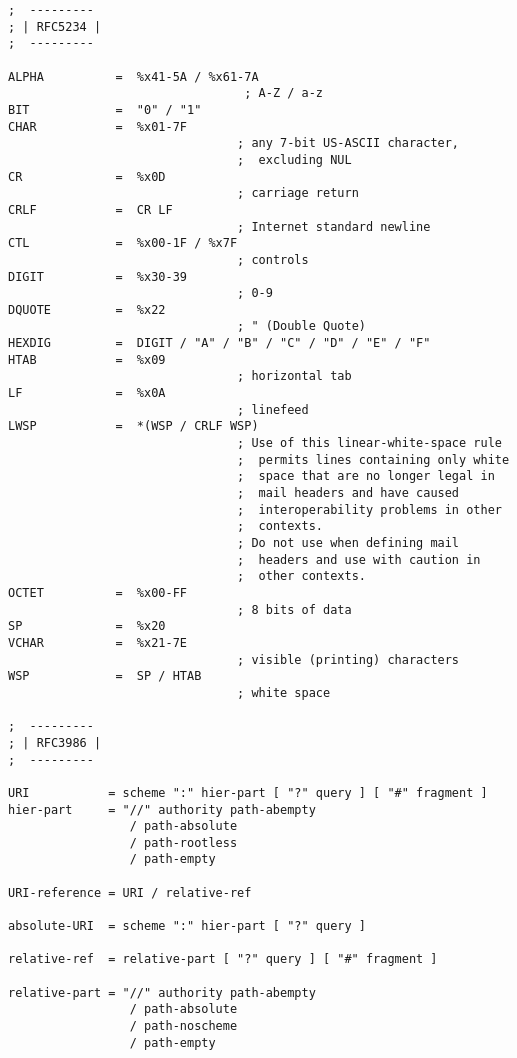 \begin{verbatim}
;  ---------
; | RFC5234 |
;  ---------

ALPHA          =  %x41-5A / %x61-7A
                                 ; A-Z / a-z
BIT            =  "0" / "1"
CHAR           =  %x01-7F
                                ; any 7-bit US-ASCII character,
                                ;  excluding NUL
CR             =  %x0D
                                ; carriage return
CRLF           =  CR LF
                                ; Internet standard newline
CTL            =  %x00-1F / %x7F
                                ; controls
DIGIT          =  %x30-39
                                ; 0-9
DQUOTE         =  %x22
                                ; " (Double Quote)
HEXDIG         =  DIGIT / "A" / "B" / "C" / "D" / "E" / "F"
HTAB           =  %x09
                                ; horizontal tab
LF             =  %x0A
                                ; linefeed
LWSP           =  *(WSP / CRLF WSP)
                                ; Use of this linear-white-space rule
                                ;  permits lines containing only white
                                ;  space that are no longer legal in
                                ;  mail headers and have caused
                                ;  interoperability problems in other
                                ;  contexts.
                                ; Do not use when defining mail
                                ;  headers and use with caution in
                                ;  other contexts.
OCTET          =  %x00-FF
                                ; 8 bits of data
SP             =  %x20
VCHAR          =  %x21-7E
                                ; visible (printing) characters
WSP            =  SP / HTAB
                                ; white space

;  ---------
; | RFC3986 |
;  ---------

URI           = scheme ":" hier-part [ "?" query ] [ "#" fragment ]
hier-part     = "//" authority path-abempty
                 / path-absolute
                 / path-rootless
                 / path-empty

URI-reference = URI / relative-ref

absolute-URI  = scheme ":" hier-part [ "?" query ]

relative-ref  = relative-part [ "?" query ] [ "#" fragment ]

relative-part = "//" authority path-abempty
                 / path-absolute
                 / path-noscheme
                 / path-empty


\end{verbatim}
